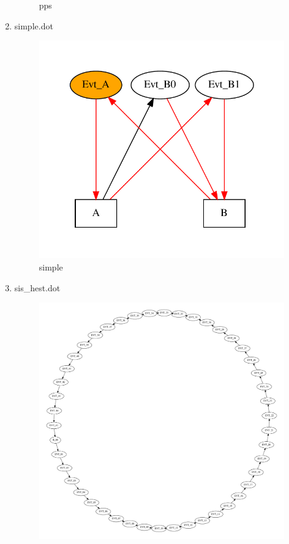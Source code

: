 \documentclass[12pt,a4paper]{report}
\begin{document}
\begin{enumerate}
\begin{figure}
        \caption{pps}
        \label{fig:pps}
    \end{figure}
\item simple.dot
    \begin{figure}
        \centering 
        \includegraphics*[width=1.0\textwidth,keepaspectratio]{TestPattern/simple.pdf}
        \caption{simple}
        \label{fig:simple}
    \end{figure}
\item sis\_hest.dot
    \begin{figure}
        \centering 
        \includegraphics*[width=1.0\textwidth,keepaspectratio]{TestPattern/sis_hest.pdf}

\end{figure}
\end{enumerate}
\end{document}
